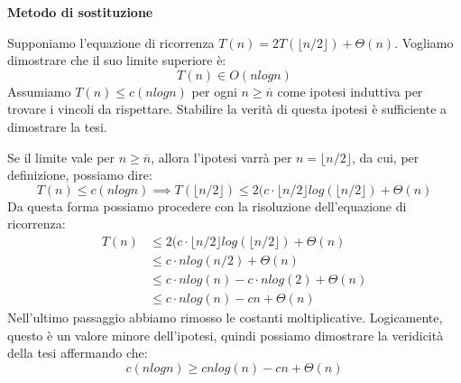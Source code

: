 \begin{esempio}
	\textbf{Metodo di sostituzione}\par
	\noindent Supponiamo l'equazione di ricorrenza $T(n) = 2T(\lfloor n/2\rfloor)+\Theta(n)$. Vogliamo dimostrare che il suo limite superiore è: \[T(n) \in O(nlogn)\]
	\noindent Assumiamo $T(n) \leq c(nlogn)$ per ogni $n \geq \overline{n}$ come ipotesi induttiva per trovare i vincoli da rispettare. Stabilire la verità di questa ipotesi è sufficiente a dimostrare la tesi.\par
	Se il limite vale per $n \geq \overline{n}$, allora l'ipotesi varrà per $n = \lfloor n/2\rfloor$, da cui, per definizione, possiamo dire: \[T(n) \leq c(nlogn)\implies T(\lfloor n/2\rfloor) \leq 2(c\cdot \lfloor n/2\rfloor log(\lfloor n/2\rfloor) + \Theta(n)\]
	\noindent Da questa forma possiamo procedere con la risoluzione dell'equazione di ricorrenza: \begin{equation}
		\begin{split}
			T(n) &\leq 2(c\cdot \lfloor n/2\rfloor log(\lfloor n/2\rfloor) + \Theta(n)\\
				&\leq c\cdot nlog(n/2) + \Theta(n)\\
				&\leq c\cdot nlog(n) - c\cdot nlog(2) + \Theta(n)\\
				&\leq c\cdot nlog(n) - cn + \Theta(n)
		\end{split}
	\end{equation}
	\noindent Nell'ultimo passaggio abbiamo rimosso le costanti moltiplicative. Logicamente, questo è un valore minore dell'ipotesi, quindi possiamo dimostrare la veridicità della tesi affermando che: \[c(nlogn) \geq cnlog(n) - cn + \Theta(n)\]
\end{esempio}
